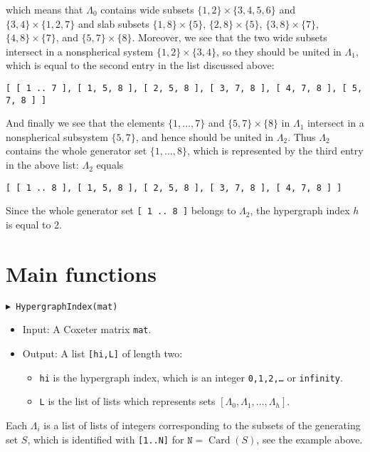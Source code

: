 \documentclass[10pt]{amsart}
\newcommand{\Card}{\operatorname{Card}}
\begin{document}
\noindent
which means that $\Lambda_0$ contains wide subsets $\{1,2\}\times\{3,4,5,6\}$ and $\{3,4\}\times\{1,2,7\}$ and slab subsets $\{1,8\}\times\{5\}$, $\{2,8\}\times\{5\}$, $\{3,8\}\times\{7\}$, $\{4,8\}\times\{7\}$, and $\{5,7\}\times\{8\}$. Moreover, we see that the two wide subsets intersect in a nonspherical system $\{1,2\}\times\{3,4\}$, so they should be united in $\Lambda_1$, which is equal to the second entry in the list discussed above:
\medskip\noindent
{\footnotesize
\begin{verbatim}
[ [ 1 .. 7 ], [ 1, 5, 8 ], [ 2, 5, 8 ], [ 3, 7, 8 ], [ 4, 7, 8 ], [ 5, 7, 8 ] ]
\end{verbatim}}\noindent
And finally we see that the elements $\{1,\dots,7\}$ and $\{5,7\}\times\{8\}$ in $\Lambda_1$ intersect in a nonspherical subsystem $\{5,7\}$, and hence should be united in $\Lambda_2$. Thus $\Lambda_2$ contains the whole generator set $\{1,\dots,8\}$, which is represented by the third entry in the above list: $\Lambda_2$ equals
\medskip\noindent
{\footnotesize
\begin{verbatim}
[ [ 1 .. 8 ], [ 1, 5, 8 ], [ 2, 5, 8 ], [ 3, 7, 8 ], [ 4, 7, 8 ] ] 
\end{verbatim}}\noindent
Since the whole generator set {\tt [ 1 .. 8 ]} belongs to $\Lambda_2$, the hypergraph index $h$ is equal to 2.


\section{Main functions}

\noindent
{\tt $\blacktriangleright$ HypergraphIndex(mat)}

\noindent 
\begin{itemize}
\item{} Input: A Coxeter matrix {\tt mat}.
\item{} Output: A list {\tt [hi,L]} of length two:
\begin{itemize}
\item{} {\tt hi} is the hypergraph index, which is an integer {\tt 0,1,2,\dots} or {\tt infinity}.
\item{} {\tt L} is the list of lists which represents sets $[\Lambda_0,\Lambda_1,\dots,\Lambda_h]$.
\end{itemize}
\end{itemize}
Each $\Lambda_i$ is a list of lists of integers corresponding to the subsets of the generating set $S$, which is identified with {\tt [1..N]} for $\mathtt{N}=\Card(S)$, see the example above.
\end{document}
